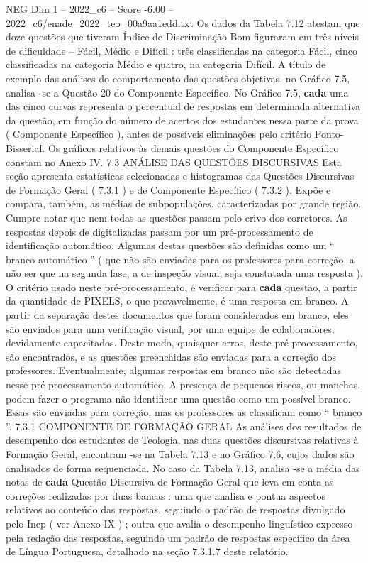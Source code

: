 \begin{textsample}{NEG Dim 1 – 2022\_c6 – Score -6.00 – 2022\_c6/enade\_2022\_teo\_00a9aa1edd.txt}
Os dados da Tabela 7.12 atestam que doze questões que tiveram Índice de Discriminação Bom figuraram em três níveis de dificuldade – Fácil, Médio e Difícil : três classificadas na categoria Fácil, cinco classificadas na categoria Médio e quatro, na categoria Difícil.
A título de exemplo das análises do comportamento das questões objetivas, no Gráfico 7.5, analisa -se a Questão 20 do Componente Específico.
No Gráfico 7.5, \textbf{cada} uma das cinco curvas representa o percentual de respostas em determinada alternativa da questão, em função do número de acertos dos estudantes nessa parte da prova ( Componente Específico ), antes de possíveis eliminações pelo critério Ponto-Bisserial.
Os gráficos relativos às demais questões do Componente Específico constam no Anexo IV. 7.3 ANÁLISE DAS QUESTÕES DISCURSIVAS Esta seção apresenta estatísticas selecionadas e histogramas das Questões Discursivas de Formação Geral ( 7.3.1 ) e de Componente Específico ( 7.3.2 ).
Expõe e compara, também, as médias de subpopulações, caracterizadas por grande região.
Cumpre notar que nem todas as questões passam pelo crivo dos corretores.
As respostas depois de digitalizadas passam por um pré-processamento de identificação automático.
Algumas destas questões são definidas como um “ branco automático ” ( que não são enviadas para os professores para correção, a não ser que na segunda fase, a de inspeção visual, seja constatada uma resposta ).
O critério usado neste pré-processamento, é verificar para \textbf{cada} questão, a partir da quantidade de PIXELS, o que provavelmente, é uma resposta em branco.
A partir da separação destes documentos que foram considerados em branco, eles são enviados para uma verificação visual, por uma equipe de colaboradores, devidamente capacitados.
Deste modo, quaisquer erros, deste pré-processamento, são encontrados, e as questões preenchidas são enviadas para a correção dos professores.
Eventualmente, algumas respostas em branco não são detectadas nesse pré-processamento automático.
A presença de pequenos riscos, ou manchas, podem fazer o programa não identificar uma questão como um possível branco.
Essas são enviadas para correção, mas os professores as classificam como “ branco ”. 7.3.1 COMPONENTE DE FORMAÇÃO GERAL As análises dos resultados de desempenho dos estudantes de Teologia, nas duas questões discursivas relativas à Formação Geral, encontram -se na Tabela 7.13 e no Gráfico 7.6, cujos dados são analisados de forma sequenciada.
No caso da Tabela 7.13, analisa -se a média das notas de \textbf{cada} Questão Discursiva de Formação Geral que leva em conta as correções realizadas por duas bancas : uma que analisa e pontua aspectos relativos ao conteúdo das respostas, seguindo o padrão de respostas divulgado pelo Inep ( ver Anexo IX ) ; outra que avalia o desempenho linguístico expresso pela redação das respostas, seguindo um padrão de respostas específico da área de Língua Portuguesa, detalhado na seção 7.3.1.7 deste relatório.

\end{textsample}
